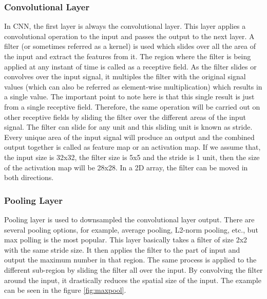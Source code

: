\subsubsection{Convolutional Layer}
In CNN, the first layer is always the convolutional layer. This layer applies a convolutional operation to the input and passes the output to the next layer. A filter (or sometimes referred as a kernel) is used which slides over all the area of the input and extract the features from it. The region where the filter is being applied at any instant of time is called as a receptive field. As the filter slides or convolves over the input signal, it multiples the filter with the original signal values (which can also be referred as element-wise multiplication) which results in a single value. The important point to note here is that this single result is just from a single receptive field. Therefore, the same operation will be carried out on other receptive fields by sliding the filter over the different areas of the input signal. The filter can slide for any unit and this sliding unit is known as stride. Every unique area of the input signal will produce an output and the combined output together is called as feature map or an activation map.  If we assume that, the input size is 32x32, the filter size is 5x5 and the stride is 1 unit, then the size of the activation map will be 28x28. In a 2D array, the filter can be moved in both directions.

\subsubsection{Pooling Layer}
Pooling layer is used to downsampled the convolutional layer output. There are several pooling options, for example, average pooling, L2-norm pooling, etc., but max polling is the most popular. This layer basically takes a filter of size 2x2 with the same stride size. It then applies the filter to the part of input and output the maximum number in that region. The same process is applied to the different sub-region by sliding the filter all over the input. By convolving the filter around the input, it drastically reduces the spatial size of the input. The example can be seen in the figure \ref{fig:maxpool}.

